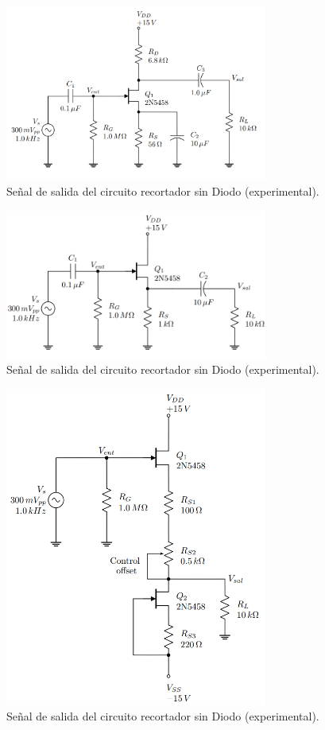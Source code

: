 \documentclass[journal]{IEEEtran}
\begin{document}
\begin{figure}[H]
        \centering
        \includegraphics[width=3.4in]{Circ1.png}
        \caption{Señal de salida del circuito recortador sin Diodo (experimental).}
        \label{fig:Circuito1}
\end{figure}

\begin{figure}[H]
        \centering
        \includegraphics[width=3.4in]{CIRC2.png}
        \caption{Señal de salida del circuito recortador sin Diodo (experimental).}
        \label{fig:Circuito2}
\end{figure}

\begin{figure}[H]
        \centering
        \includegraphics[width=3.4in]{CIRC2_2.png}
        \caption{Señal de salida del circuito recortador sin Diodo (experimental).}
        \label{fig:Circuito2_2}
\end{figure}
\end{document}
